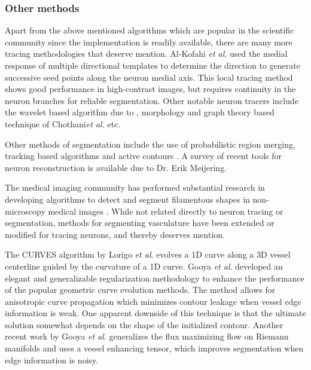 \subsubsection{Other methods}
Apart from the above mentioned algorithms which are popular in the scientific community since the implementation is readily available, there are many more tracing methodologies that deserve mention. Al-Kofahi \textit{et al}. \cite{al_kofahi} used the medial response of multiple directional templates to determine the  direction to generate successive seed points along the neuron medial axis. This local tracing method shows good performance in high-contrast images, but requires continuity in the neuron branches for reliable segmentation. Other notable neuron tracers include the wavelet based algorithm due to \cite{dima_wavalet}, morphology and graph theory based technique of Chothani\textit{et al.} etc. 

Other methods of segmentation include the use of probabilistic region merging\cite{srinivasan2007automated},  tracking based algorithms \cite{wang2007dynamic,choromanska2012automatic} and active contours \cite{wang2011novel}. A survey of recent tools for neuron reconstruction is available due to Dr. Erik Meijering\cite{meijering_survey}.

The medical imaging community has performed substantial research in developing algorithms to detect and segment filamentous shapes in non-microscopy medical images \cite{lesage2009review}. While not related directly to neuron tracing or segmentation, methods for segmenting vasculature have been extended or modified for tracing neurons, and thereby deserves mention.

The CURVES algorithm by Lorigo \textit{et al}. \cite{lorigo2001curves} evolves a 1D curve along a 3D vessel centerline guided by the curvature of a 1D curve. Gooya \textit{et al}.\cite{gooya2008variational} developed an elegant and generalizable  regularization methodology to enhance the performance of the popular geometric curve evolution methods. The method allows for anisotropic curve propagation  which minimizes contour leakage when vessel edge information is weak. One apparent downside of this technique is that the ultimate solution somewhat depends on the shape of the initialized contour. Another recent work by Gooya \textit{et al}.\cite{gooya2012generalization} generalizes the flux maximizing flow \cite{flux_max} on Riemann manifolds and uses a vessel enhancing tensor, which improves segmentation when edge information is noisy.

